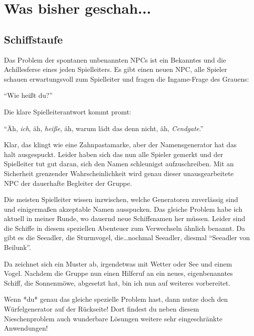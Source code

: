 \documentclass[final]{multiversum}
\begin{document}
\makemultititle
%

\section{Was bisher geschah...}

\subsection{Schiffstaufe}
Das Problem der spontanen unbenannten NPCs ist ein Bekanntes und die Achillesferse eines jeden Spielleiters.
Es gibt einen neuen NPC, alle Spieler schauen erwartungsvoll zum Spielleiter und fragen die Ingame-Frage des Grauens:

\enquote{Wie heißt du?}

Die klare Spielleiterantwort kommt promt:

\enquote{Äh, \textit{ich}, äh, \textit{heiße}, äh, warum lädt das denn nicht, äh, \textit{Cendgate}.}

Klar, das klingt wie eine Zahnpastamarke, aber der Namensgenerator hat das halt ausgespuckt.
Leider haben sich das nun alle Spieler gemerkt und der Spielleiter tut gut daran, sich den Namen schleunigst aufzuschreiben.
Mit an Sicherheit grenzender Wahrscheinlichkeit wird genau dieser unausgearbeitete NPC der dauerhafte Begleiter der Gruppe.

Die meisten Spielleiter wissen inzwischen, welche Generatoren zuverlässig sind und einigermaßen akzeptable Namen ausspucken.
Das gleiche Problem habe ich aktuell in meiner Runde, wo dauernd neue Schiffsnamen her müssen.
Leider sind die Schiffe in diesem speziellen Abenteuer zum Verwechseln ähnlich benannt.
Da gibt es die Seeadler, die Sturmvogel, die\dots nochmal Seeadler, diesmal \enquote{Seeadler von Beilunk}.

Da zeichnet sich ein Muster ab, irgendetwas mit Wetter oder See und einem Vogel.
Nachdem die Gruppe nun einen Hilferuf an ein neues, eigenbenanntes Schiff, die Sonnenmöwe, abgesetzt hat, bin ich nun auf weiteres vorbereitet.

Wenn *du* genau das gleiche spezielle Problem hast, dann nutze doch den Würfelgenerator auf der Rückseite!
Dort findest du neben diesem Nieschenproblem auch wunderbare Lösungen weitere sehr eingeschränkte Anwendungen!
\end{document}
